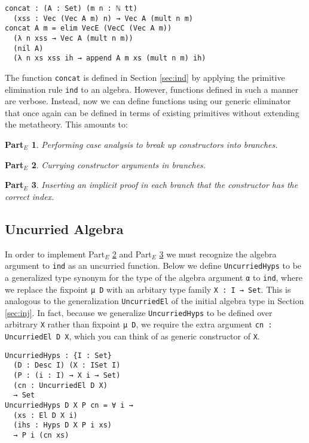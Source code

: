 \documentclass[preprint,nonatbib]{sigplanconf}
\newtheorem{myparte}{Part$_E$}
\newcommand{\refsec}[1]{Section \ref{sec:#1}}
\newcommand{\refparte}[1]{Part$_E$ \ref{parte:#1}}
\begin{document}
\begin{verbatim}
concat : (A : Set) (m n : ℕ tt)
  (xss : Vec (Vec A m) n) → Vec A (mult n m)
concat A m = elim VecE (VecC (Vec A m))
  (λ n xss → Vec A (mult n m))
  (nil A)
  (λ n xs xss ih → append A m xs (mult n m) ih)
\end{verbatim}



The function {\tt concat} is defined in \refsec{ind} by applying the
primitive elimination rule {\tt ind} to an algebra. However,
functions defined in such a manner are verbose. Instead, now we
can define functions using our generic eliminator that once again can
be defined in terms of existing primitives without extending the
metatheory. This amounts to:

\begin{myparte}
\label{parte:one}
Performing case analysis to break up constructors into branches.
\end{myparte}

\begin{myparte}
\label{parte:two}
Currying constructor arguments in branches.
\end{myparte}

\begin{myparte}
\label{parte:three}
Inserting an implicit proof in each branch that the constructor has the correct index.
\end{myparte}

\subsection{Uncurried Algebra}

In order to implement
\refparte{two} and \refparte{three} we must recognize the algebra
argument to {\tt ind} as an uncurried function.
Below we define {\tt UncurriedHyps} to be a generalized type synonym
for the type of the algebra argument {\tt α} to {\tt ind}, where we
replace the fixpoint
{\tt μ D} with an arbitary type family {\tt X : I → Set}. This is
analogous to the generalization {\tt UncurriedEl} of the initial
algebra type in \refsec{inj}. In fact, because we generalize
{\tt UncurriedHyps} to be defined over arbitrary {\tt X} rather than
fixpoint {\tt μ D}, we require the extra argument
{\tt cn : UncurriedEl D X}, which you can think of as generic
constructor of {\tt X}.

\begin{verbatim}
UncurriedHyps : {I : Set}
  (D : Desc I) (X : ISet I)
  (P : (i : I) → X i → Set)
  (cn : UncurriedEl D X)
  → Set
UncurriedHyps D X P cn = ∀ i →
  (xs : El D X i)
  (ihs : Hyps D X P i xs)
  → P i (cn xs)
\end{verbatim}
\end{document}
